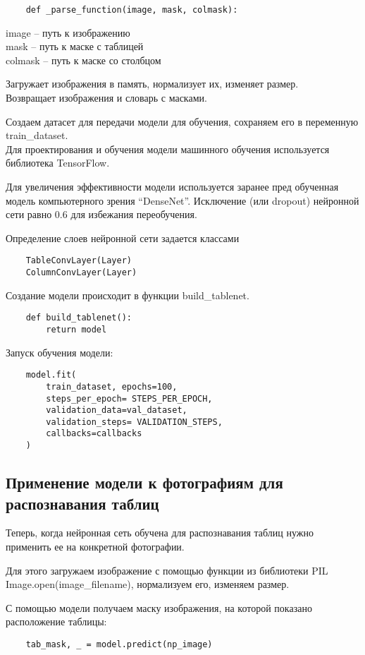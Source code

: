 \documentclass[a4paper, 12pt]{report}
\begin{document}
\begin{lstlisting}
    def _parse_function(image, mask, colmask):
\end{lstlisting}
image – путь к изображению\\
mask – путь к маске с таблицей\\
colmask – путь к маске со столбцом

Загружает изображения в память, нормализует их, изменяет размер.\\
Возвращает изображения и словарь с масками.

Создаем датасет для передачи модели для обучения, сохраняем его в переменную train\_dataset.\\
Для проектирования и обучения модели машинного обучения используется библиотека TensorFlow.

Для увеличения эффективности модели используется заранее пред обученная модель компьютерного зрения “DenseNet”. Исключение (или dropout) нейронной сети равно 0.6 для избежания переобучения.

Определение слоев нейронной сети задается классами
\begin{lstlisting}
    TableConvLayer(Layer)
    ColumnConvLayer(Layer)
\end{lstlisting}

Создание модели происходит в функции build\_tablenet.
\begin{lstlisting}
    def build_tablenet():
        return model
\end{lstlisting}

Запуск обучения модели:
\begin{lstlisting}
    model.fit(
        train_dataset, epochs=100,
        steps_per_epoch= STEPS_PER_EPOCH,
        validation_data=val_dataset,
        validation_steps= VALIDATION_STEPS,
        callbacks=callbacks
    )
\end{lstlisting}

\subsection*{Применение модели к фотографиям для распознавания таблиц}
Теперь, когда нейронная сеть обучена для распознавания таблиц нужно применить ее на конкретной фотографии.

Для этого загружаем изображение с помощью функции из библиотеки PIL Image.open(image\_filename), нормализуем его, изменяем размер.

С помощью модели получаем маску изображения, на которой показано расположение таблицы:
\begin{lstlisting}
    tab_mask, _ = model.predict(np_image)
\end{lstlisting}
\end{document}
